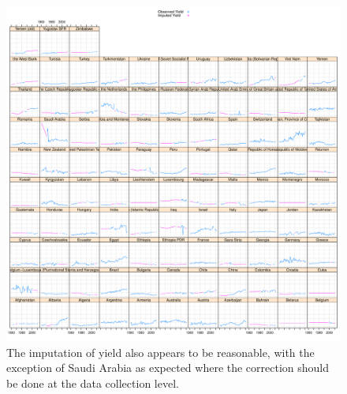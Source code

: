 \documentclass[nojss]{jss}\usepackage[]{graphicx}\usepackage[]{color}
\makeatletter
\def\maxwidth{ %
  \ifdim\Gin@nat@width>\linewidth
    \linewidth
  \else
    \Gin@nat@width
  \fi
}
\newenvironment{knitrout}{}{} %
\makeatother
\begin{document}
\begin{knitrout}
\color{fgcolor}\begin{figure}[!ht]


{\centering \includegraphics[width=\maxwidth]{figure/grape-yield-imputed} 

}

\caption[The imputation of yield also appears to be reasonable, with the exception of Saudi Arabia as expected where the correction should be done at the data collection level]{The imputation of yield also appears to be reasonable, with the exception of Saudi Arabia as expected where the correction should be done at the data collection level.\label{fig:grape-yield-imputed}}
\end{figure}


\end{knitrout}
\end{document}
